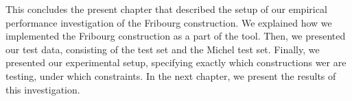 
This concludes the present chapter that described the setup of our empirical performance investigation of the Fribourg construction. We explained how we implemented the Fribourg construction as a part of the \goal tool. Then, we presented our test data, consisting of the \goal{} test set and the Michel test set. Finally, we presented our experimental setup, specifying exactly which constructions wer are testing, under which constraints. In the next chapter, we present the results of this investigation.

